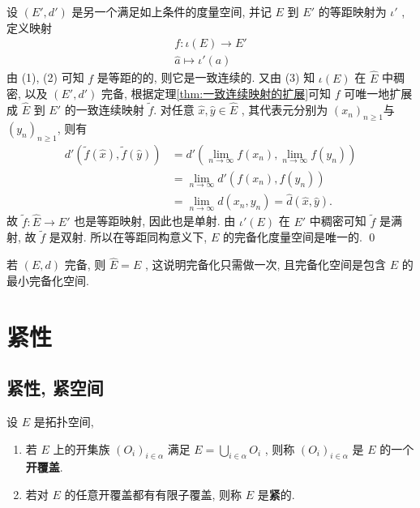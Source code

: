 \begin{Proof}
          设 $ (E', d') $ 是另一个满足如上条件的度量空间, 并记 $ E $ 到 $ E' $ 的等距映射为 $ \iota' $ , 定义映射
          \[
               \begin{aligned}
                    f: \iota(E)  \to E'\\
                    \hat{a} \mapsto \iota'(a)
               \end{aligned}
          \]
          由 (1), (2) 可知 $ f $ 是等距的的, 则它是一致连续的. 又由 (3) 知 $ \iota(E) $ 在 $ \widehat{E} $ 中稠密, 以及 $ (E', d') $ 完备, 根据定理\ref{thm:一致连续映射的扩展}可知 $ f $ 可唯一地扩展成 $ \widehat{E} $ 到 $ E' $ 的一致连续映射 $ \tilde{f} $. 对任意 $ \hat{x}, \hat{y}\in \widehat{E} $ , 其代表元分别为 $ (x_{n})_{n\geqslant1} $与 $ (y_{n})_{n\geqslant1} $, 则有
          \[
               \begin{aligned}
                    d'(\tilde{f}(\hat{x}), \tilde{f}(\hat{y})) & = d'(\lim_{n\to\infty}f(x_{n}), \lim_{n\to\infty}f(y_{n}))\\
                    & = \lim_{n\to\infty} d'(f(x_{n}), f(y_{n}))\\
                    & = \lim_{n\to\infty} d(x_{n}, y_{n})=\hat{d}(\hat{x}, \hat{y}).
               \end{aligned}
          \]
          故 $ \tilde{f}:\widehat{E}\to E' $ 也是等距映射, 因此也是单射. 由 $ \iota'(E) $ 在 $ E' $ 中稠密可知 $ \tilde{f} $ 是满射, 故 $ \tilde{f} $ 是双射. 所以在等距同构意义下, $ E $ 的完备化度量空间是唯一的. \qed
     \end{Proof}

     \begin{Remark}
          若 $ (E, d) $ 完备, 则 $ \widehat{E}=E $ , 这说明完备化只需做一次, 且完备化空间是包含 $ E $ 的最小完备化空间.
     \end{Remark}

\section{紧性}
     \subsection{紧性, 紧空间}
     \begin{Definition}[紧性]\label{def:紧性}
           设 $ E $ 是拓扑空间,
           \begin{enumerate}[(1)]
                \item 若 $ E $ 上的开集族 $ (O_{i})_{i\in \alpha} $ 满足 $ E=\bigcup_{i\in\alpha}O_{i} $ , 则称 $ (O_{i})_{i\in\alpha} $ 是 $ E $ 的一个\textbf{开覆盖}.
                \item 若对 $ E $ 的任意开覆盖都有有限子覆盖, 则称 $ E $ 是\textbf{紧}的.
           \end{enumerate}
     \end{Definition}

